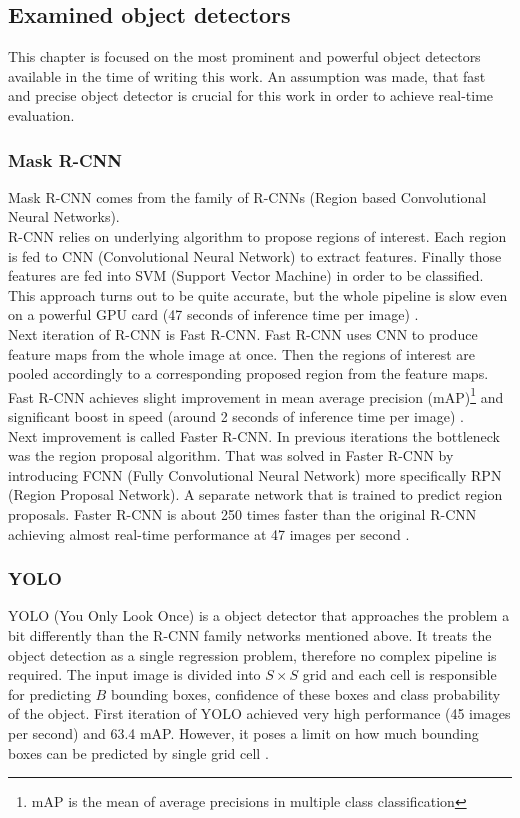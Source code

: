 \documentclass[thesis=M,english]{FITthesis}[2019/03/06]
\begin{document}
\subsection{Examined object detectors}
This chapter is focused on the most prominent and powerful object detectors available in the time of writing this work. An assumption was made, that fast and precise object detector is crucial for this work in order to achieve real-time evaluation. 
\subsubsection{Mask R-CNN}
Mask R-CNN comes from the family of R-CNNs (Region based Convolutional Neural Networks).\\

R-CNN relies on underlying algorithm to propose regions of interest. Each region is fed to CNN (Convolutional Neural Network) to extract features. Finally those features are fed into SVM (Support Vector Machine) in order to be classified. This approach turns out to be quite accurate, but the whole pipeline is slow even on a powerful GPU card (47 seconds of inference time per image) \cite{rcnn} \cite{fast-rcnn}.\\

Next iteration of R-CNN is Fast R-CNN. Fast R-CNN uses CNN to produce feature maps from the whole image at once. Then the regions of interest are pooled accordingly to a corresponding proposed region from the feature maps. Fast R-CNN achieves slight improvement in mean average precision (mAP)\footnote{mAP is the mean of average precisions in multiple class classification} and significant boost in speed (around 2 seconds of inference time per image) \cite{fast-rcnn}.\\

Next improvement is called Faster R-CNN. In previous iterations the bottleneck was the region proposal algorithm. That was solved in Faster R-CNN by introducing FCNN (Fully Convolutional Neural Network) more specifically RPN (Region Proposal Network). A separate network that is trained to predict region proposals. Faster R-CNN is about 250 times faster than the original R-CNN achieving almost real-time performance at 47 images per second \cite{faster-rcnn}.






\subsubsection{YOLO}
YOLO (You Only Look Once) is a object detector that approaches the problem a bit differently than the R-CNN family networks mentioned above. It treats the object detection as a single regression problem, therefore no complex pipeline is required. The input image is divided into $S \times S$ grid and each cell is responsible for predicting $B$ bounding boxes, confidence of these boxes and class probability of the object. First iteration of YOLO achieved very high performance (45 images per second) and 63.4 mAP. However, it poses a limit on how much bounding boxes can be predicted by single grid cell \cite{yolov1}.  \\
\end{document}
